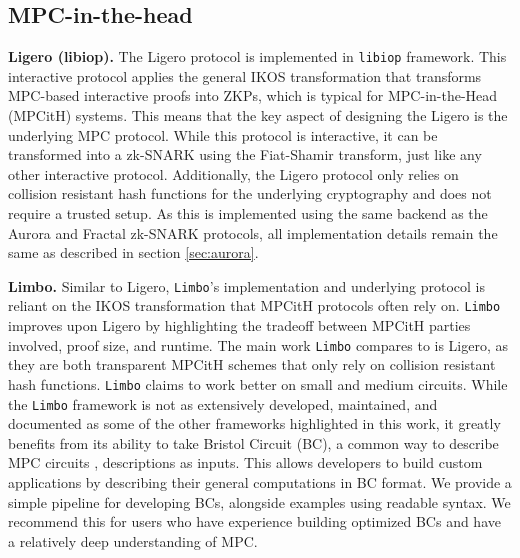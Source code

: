 



\subsection{MPC-in-the-head}

\textbf{Ligero (libiop).}
The Ligero \cite{ames2017ligero} protocol is implemented in \texttt{libiop} \cite{SciprLab2023Libiop} framework. This interactive protocol applies the general IKOS \cite{ishai2007zero} transformation that transforms MPC-based interactive proofs into ZKPs, which is typical for MPC-in-the-Head (MPCitH) systems. This means that the key aspect of designing the Ligero is the underlying MPC protocol. While this protocol is interactive, it can be transformed into a zk-SNARK using the Fiat-Shamir transform, just like any other interactive protocol. Additionally, the Ligero protocol only relies on collision resistant hash functions for the underlying cryptography and does not require a trusted setup. As this is implemented using the same backend as the Aurora and Fractal zk-SNARK protocols, all implementation details remain the same as described in section \ref{sec:aurora}.

\textbf{Limbo.}
Similar to Ligero, \texttt{Limbo}'s implementation \cite{KULeuvenCOSIC2023Limbo}  and underlying protocol \cite{limbo} is reliant on the IKOS transformation that MPCitH protocols often rely on. \texttt{Limbo} improves upon Ligero by highlighting the tradeoff between MPCitH parties involved, proof size, and runtime.
The main work \texttt{Limbo} compares to is Ligero, as they are both transparent MPCitH schemes that only rely on collision resistant hash functions. \texttt{Limbo} claims to work better on small and medium circuits. While the \texttt{Limbo} framework is not as extensively developed, maintained, and documented as some of the other frameworks highlighted in this work, it greatly benefits from its ability to take Bristol Circuit (BC), a common way to describe MPC circuits \cite{bristol}, descriptions as inputs. This allows developers to build custom applications by describing their general computations in BC format. We provide a simple pipeline for developing BCs, alongside examples using readable syntax. We recommend this for users who have experience building optimized BCs and have a relatively deep understanding of MPC.

